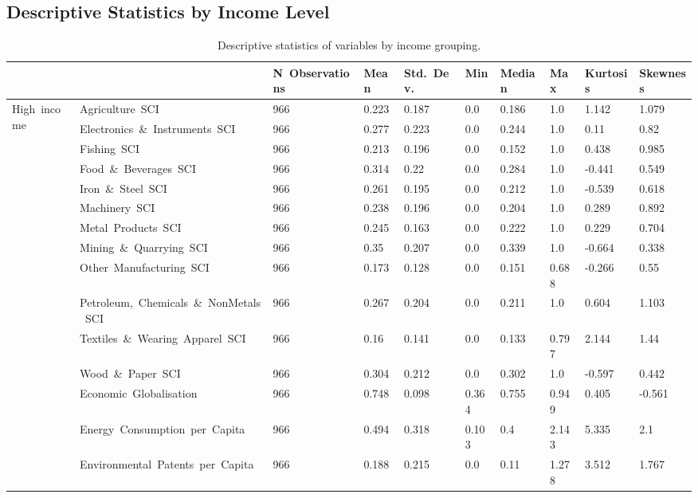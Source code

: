 \begin{appendices}
\section{Descriptive Statistics by Income Level}
\label{annex:statisticsincome}
\begin{table}[H]
	\centering
	\caption{Descriptive statistics of variables by income grouping.}
      \label{tab:descriptive-income}
	\small
\begin{adjustbox}{width=\textwidth,center}
	\begin{tabular}{llllllllll}
	\toprule
	 &  & N\ Observations & Mean & Std.\ Dev. & Min & Median & Max & Kurtosis & Skewness \\
	\midrule
	\multirow[t]{19}{*}{High\ income} & Agriculture\ SCI & 966 & 0.223 & 0.187 & 0.0 & 0.186 & 1.0 & 1.142 & 1.079 \\
	 & Electronics\ \&\ Instruments\ SCI & 966 & 0.277 & 0.223 & 0.0 & 0.244 & 1.0 & 0.11 & 0.82 \\
	 & Fishing\ SCI & 966 & 0.213 & 0.196 & 0.0 & 0.152 & 1.0 & 0.438 & 0.985 \\
	 & Food\ \&\ Beverages\ SCI & 966 & 0.314 & 0.22 & 0.0 & 0.284 & 1.0 & -0.441 & 0.549 \\
	 & Iron\ \&\ Steel\ SCI & 966 & 0.261 & 0.195 & 0.0 & 0.212 & 1.0 & -0.539 & 0.618 \\
	 & Machinery\ SCI & 966 & 0.238 & 0.196 & 0.0 & 0.204 & 1.0 & 0.289 & 0.892 \\
	 & Metal\ Products\ SCI & 966 & 0.245 & 0.163 & 0.0 & 0.222 & 1.0 & 0.229 & 0.704 \\
	 & Mining\ \&\ Quarrying\ SCI & 966 & 0.35 & 0.207 & 0.0 & 0.339 & 1.0 & -0.664 & 0.338 \\
	 & Other\ Manufacturing\ SCI & 966 & 0.173 & 0.128 & 0.0 & 0.151 & 0.688 & -0.266 & 0.55 \\
	 & Petroleum,\ Chemicals\ \&\ Non\-Metals\ SCI & 966 & 0.267 & 0.204 & 0.0 & 0.211 & 1.0 & 0.604 & 1.103 \\
	 & Textiles\ \&\ Wearing\ Apparel\ SCI & 966 & 0.16 & 0.141 & 0.0 & 0.133 & 0.797 & 2.144 & 1.44 \\
	 & Wood\ \&\ Paper\ SCI & 966 & 0.304 & 0.212 & 0.0 & 0.302 & 1.0 & -0.597 & 0.442 \\
	 & Economic\ Globalisation & 966 & 0.748 & 0.098 & 0.364 & 0.755 & 0.949 & 0.405 & -0.561 \\
	 & Energy\ Consumption\ per\ Capita & 966 & 0.494 & 0.318 & 0.103 & 0.4 & 2.143 & 5.335 & 2.1 \\
	 & Environmental\ Patents\ per\ Capita & 966 & 0.188 & 0.215 & 0.0 & 0.11 & 1.278 & 3.512 & 1.767 \\

\end{tabular}
\end{adjustbox}
\end{table}
\end{appendices}
